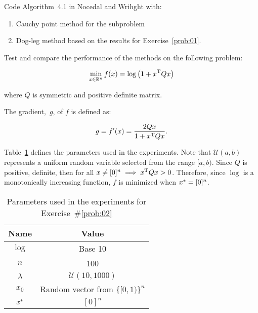 \begin{problem}\label{prob:02}
  Code Algorithm~4.1 in Nocedal and Wrihght with:
  
  \begin{enumerate}
    \item Cauchy point method for the subproblem
    \item Dog-leg method based on the results for Exercise~\ref{prob:01}.
  \end{enumerate}

  \noindent
  Test and compare the performance of the methods on the following problem:
  
  \[\min_{x\in \mathbb{R}^n} f(x) = \log\left(1+x^{\textnormal{T}} Qx\right)\]
  
  \noindent
  where $Q$ is symmetric and positive definite matrix.
\end{problem}


The gradient,~$g$, of $f$ is defined as: 

\[g = f'(x) = \frac{2Qx}{1+x^{\textnormal{T}} Q x}\text{.}\]

\noindent
Table~\ref{tab:p02:experimentParameters} defines the parameters used in the experiments.  Note that $\mathcal{U}(a,b)$ represents a uniform random variable selected from the range $[a,b)$. Since $Q$ is positive, definite, then for all $x \ne [0]^n \implies x^{\textnormal{T}} Q x > 0$.  Therefore, since $\log$ is a monotonically increasing function, $f$ is minimized when $x^{*} = [0]^n$.

\begin{table}[h]
  \caption{Parameters used in the experiments for Exercise~\#\ref{prob:02}}\label{tab:p02:experimentParameters}
  \centering
  \begin{tabular}{|c|c|}
    \hline
    \textbf{Name} & \textbf{Value} \\\hline
    \hline
    $\log$    &   Base 10\\\hline
    $n$       &   100\\\hline
    $\lambda$ &   $\mathcal{U}(10,1000)$ \\\hline
    $x_0$     &   Random vector from $\{[0,1)\}^{n}$\\\hline
    $x^{*}$   &   $[0]^n$\\\hline
  \end{tabular}
\end{table}



